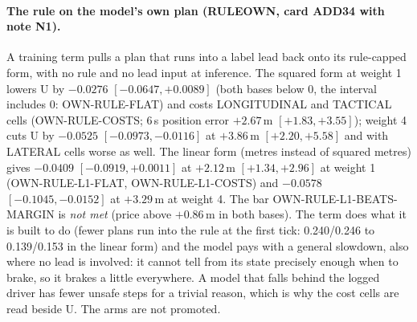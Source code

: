 \paragraph{The rule on the model's own plan (RULEOWN, card ADD34 with note N1).} A training term pulls a plan that runs into a label lead back onto its rule-capped form, with no rule and no lead input at inference. The squared form at weight 1 lowers U by $-0.0276$ $[-0.0647,+0.0089]$ (both bases below 0, the interval includes 0: OWN-RULE-FLAT) and costs LONGITUDINAL and TACTICAL cells (OWN-RULE-COSTS; 6\,s position error $+2.67$\,m $[+1.83,+3.55]$); weight 4 cuts U by $-0.0525$ $[-0.0973,-0.0116]$ at $+3.86$\,m $[+2.20,+5.58]$ and with LATERAL cells worse as well. The linear form (metres instead of squared metres) gives $-0.0409$ $[-0.0919,+0.0011]$ at $+2.12$\,m $[+1.34,+2.96]$ at weight 1 (OWN-RULE-L1-FLAT, OWN-RULE-L1-COSTS) and $-0.0578$ $[-0.1045,-0.0152]$ at $+3.29$\,m at weight 4. The bar OWN-RULE-L1-BEATS-MARGIN is \emph{not met} (price above $+0.86$\,m in both bases). The term does what it is built to do (fewer plans run into the rule at the first tick: 0.240/0.246 to 0.139/0.153 in the linear form) and the model pays with a general slowdown, also where no lead is involved: it cannot tell from its state precisely enough when to brake, so it brakes a little everywhere. A model that falls behind the logged driver has fewer unsafe steps for a trivial reason, which is why the cost cells are read beside U. The arms are not promoted.


